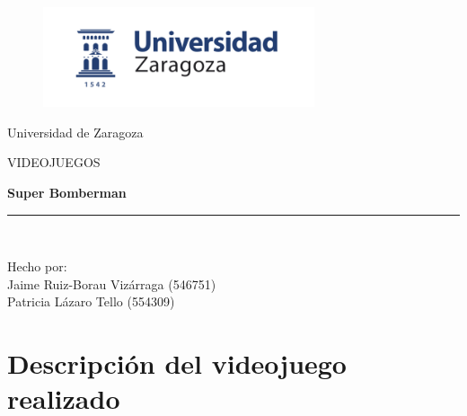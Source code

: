 \documentclass[a4paper]{article}
\begin{document}
\begin{titlepage}

\begin{center}
\vspace*{1.5in}
\vspace*{-1in}
\begin{figure}[htb]
\begin{center}
\includegraphics[width=8cm]{logoUZ.png}
\end{center}
\end{figure}

\vspace*{0.3in}

Universidad de Zaragoza \\

\vspace*{0.3in}

\begin{large}
VIDEOJUEGOS\\
\end{large}
\vspace*{0.2in}
\begin{Large}
\textbf{Super Bomberman} \\
\end{Large}
\vspace*{0.3in}
\begin{large}
\end{large}
\vspace*{0.1in}
\rule{80mm}{0.1mm}\\
\vspace*{0.1in}
\begin{large}
Hecho por: \\
Jaime Ruiz-Borau Vizárraga (546751) \\
Patricia Lázaro Tello (554309) \\

\end{large}
\end{center}

\end{titlepage}
\tableofcontents

\newpage
\section{Descripción del videojuego realizado}
\end{document}
